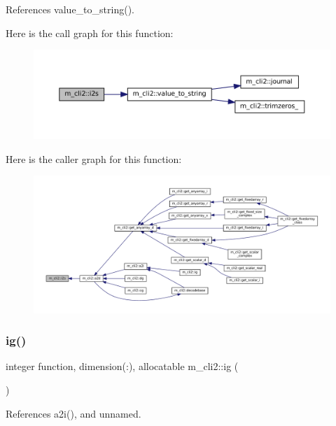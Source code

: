 References value\+\_\+to\+\_\+string().

Here is the call graph for this function\+:
\nopagebreak
\begin{figure}[H]
\begin{center}
\leavevmode
\includegraphics[width=350pt]{namespacem__cli2_aa106d3533fd6d4845f0b3e94b2a79ffb_cgraph}
\end{center}
\end{figure}
Here is the caller graph for this function\+:
\nopagebreak
\begin{figure}[H]
\begin{center}
\leavevmode
\includegraphics[width=350pt]{namespacem__cli2_aa106d3533fd6d4845f0b3e94b2a79ffb_icgraph}
\end{center}
\end{figure}
\mbox{\label{namespacem__cli2_a11c3cc864e613c90b2a02c7409c00828}} 
\subsubsection{\texorpdfstring{ig()}{ig()}}
{\footnotesize\ttfamily integer function, dimension(\+:), allocatable m\+\_\+cli2\+::ig (\begin{DoxyParamCaption}{ }\end{DoxyParamCaption})\hspace{0.3cm}{\ttfamily [private]}}



References a2i(), and unnamed.

